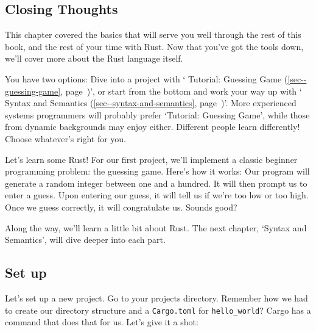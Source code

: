 \documentclass[a4paper,]{book}
\renewcommand*{\hyperref}[2][\ar]{%
  \def\ar{#2}%
  #2 (\autoref{#1}, page~\pageref{#1})}
\newenvironment{Shaded}{\begin{snugshade}}{\end{snugshade}}
\newcommand{\KeywordTok}[1]{\textcolor[rgb]{0.13,0.29,0.53}{\textbf{{#1}}}}
\newcommand{\NormalTok}[1]{{#1}}
\begin{document}
\subsection{Closing Thoughts}\label{closing-thoughts}

This chapter covered the basics that will serve you well through the
rest of this book, and the rest of your time with Rust. Now that you've
got the tools down, we'll cover more about the Rust language itself.

You have two options: Dive into a project with
`\hyperref[sec--guessing-game]{Tutorial: Guessing Game}', or start from
the bottom and work your way up with
`\hyperref[sec--syntax-and-semantics]{Syntax and Semantics}'. More
experienced systems programmers will probably prefer `Tutorial: Guessing
Game', while those from dynamic backgrounds may enjoy either. Different
people learn differently! Choose whatever's right for you.


Let's learn some Rust! For our first project, we'll implement a classic
beginner programming problem: the guessing game. Here's how it works:
Our program will generate a random integer between one and a hundred. It
will then prompt us to enter a guess. Upon entering our guess, it will
tell us if we're too low or too high. Once we guess correctly, it will
congratulate us. Sounds good?

Along the way, we'll learn a little bit about Rust. The next chapter,
`Syntax and Semantics', will dive deeper into each part.

\subsection{Set up}\label{set-up}

Let's set up a new project. Go to your projects directory. Remember how
we had to create our directory structure and a \texttt{Cargo.toml} for
\texttt{hello\_world}? Cargo has a command that does that for us. Let's
give it a shot:

\begin{Shaded}
\end{Shaded}
\end{document}
